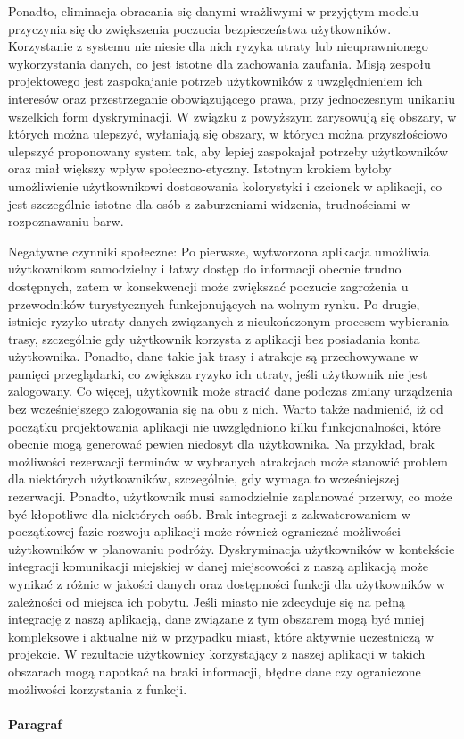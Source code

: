 Ponadto, eliminacja obracania się danymi wrażliwymi w przyjętym modelu przyczynia się do zwiększenia poczucia bezpieczeństwa użytkowników. Korzystanie z systemu nie niesie dla nich ryzyka utraty lub nieuprawnionego wykorzystania danych, co jest istotne dla zachowania zaufania. Misją zespołu projektowego jest zaspokajanie potrzeb użytkowników z uwzględnieniem ich interesów oraz przestrzeganie obowiązującego prawa, przy jednoczesnym unikaniu wszelkich form dyskryminacji.
W związku z powyższym zarysowują się obszary, w których można ulepszyć, wyłaniają się obszary, w których można przyszłościowo ulepszyć proponowany system tak, aby lepiej zaspokajał potrzeby użytkowników oraz miał większy wpływ społeczno-etyczny. Istotnym krokiem byłoby umożliwienie użytkownikowi dostosowania kolorystyki i czcionek w aplikacji, co jest szczególnie istotne dla osób z zaburzeniami widzenia, trudnościami w rozpoznawaniu barw.

Negatywne czynniki społeczne:
Po pierwsze, wytworzona aplikacja umożliwia użytkownikom samodzielny i łatwy dostęp do informacji obecnie trudno dostępnych, zatem w konsekwencji może zwiększać poczucie zagrożenia u przewodników turystycznych funkcjonujących na wolnym rynku. 
Po drugie, istnieje ryzyko utraty danych związanych z nieukończonym procesem wybierania trasy, szczególnie gdy użytkownik korzysta z aplikacji bez posiadania konta użytkownika. Ponadto, dane takie jak trasy i atrakcje są przechowywane w pamięci przeglądarki, co zwiększa ryzyko ich utraty, jeśli użytkownik nie jest zalogowany. Co więcej, użytkownik może stracić dane podczas zmiany urządzenia bez wcześniejszego zalogowania się na obu z nich.
Warto także nadmienić, iż od początku projektowania aplikacji nie uwzględniono kilku funkcjonalności, które obecnie mogą generować pewien niedosyt dla użytkownika. Na przykład, brak możliwości rezerwacji terminów w wybranych atrakcjach może stanowić problem dla niektórych użytkowników, szczególnie, gdy wymaga to wcześniejszej rezerwacji. Ponadto, użytkownik musi samodzielnie zaplanować przerwy, co może być kłopotliwe dla niektórych osób. Brak integracji z zakwaterowaniem w początkowej fazie rozwoju aplikacji może również ograniczać możliwości użytkowników w planowaniu podróży.
Dyskryminacja użytkowników w kontekście integracji komunikacji miejskiej w danej miejscowości z naszą aplikacją może wynikać z różnic w jakości danych oraz dostępności funkcji dla użytkowników w zależności od miejsca ich pobytu.
Jeśli miasto nie zdecyduje się na pełną integrację z naszą aplikacją, dane związane z tym obszarem mogą być mniej kompleksowe i aktualne niż w przypadku miast, które aktywnie uczestniczą w projekcie. W rezultacie użytkownicy korzystający z naszej aplikacji w takich obszarach mogą napotkać na braki informacji, błędne dane czy ograniczone możliwości korzystania z funkcji.

\paragraph{Paragraf}


